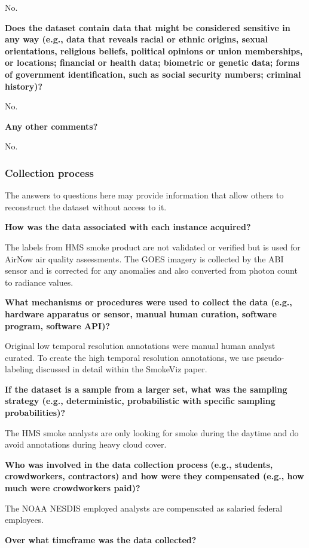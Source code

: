 \documentclass{article}
\begin{document}
No.

\textbf{Does the dataset contain data that might be considered sensitive in any way (e.g., data that reveals racial or ethnic origins, sexual orientations, religious beliefs, political opinions or union memberships, or locations; financial or health data; biometric or genetic data; forms of government identification, such as social security numbers; criminal history)?}

No.

\textbf{Any other comments?}

No.


\subsubsection{Collection process}

The answers to questions here may provide information that allow others to reconstruct the dataset without access to it.

\textbf{How was the data associated with each instance acquired?}

The labels from HMS smoke product are not validated or verified but is used for AirNow air quality assessments. The GOES imagery is collected by the ABI sensor and is corrected for any anomalies and also converted from photon count to radiance values.

\textbf{What mechanisms or procedures were used to collect the data (e.g., hardware apparatus or sensor, manual human curation, software program, software API)?}

Original low temporal resolution annotations were manual human analyst curated. To create the high temporal resolution annotations, we use pseudo-labeling discussed in detail within the SmokeViz paper.

\textbf{If the dataset is a sample from a larger set, what was the sampling strategy (e.g., deterministic, probabilistic with specific sampling probabilities)?}

The HMS smoke analysts are only looking for smoke during the daytime and do avoid annotations during heavy cloud cover.

\textbf{Who was involved in the data collection process (e.g., students, crowdworkers, contractors) and how were they compensated (e.g., how much were crowdworkers paid)?}

The NOAA NESDIS employed analysts are compensated as salaried federal employees.

\textbf{Over what timeframe was the data collected?}
\end{document}
